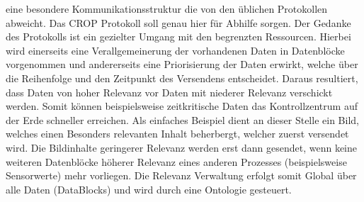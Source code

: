 eine besondere Kommunikationsstruktur die von den {\"u}blichen Protokollen 
abweicht. Das CROP Protokoll soll genau hier f{\"u}r Abhilfe sorgen. 
Der Gedanke des Protokolls ist ein gezielter Umgang mit den begrenzten 
Ressourcen. Hierbei wird einerseits eine Verallgemeinerung der vorhandenen 
Daten in Datenbl{\"o}cke vorgenommen und andererseits eine Priorisierung der 
Daten erwirkt, welche {\"u}ber die Reihenfolge und den Zeitpunkt des 
Versendens entscheidet. Daraus resultiert, dass Daten von hoher Relevanz 
vor Daten mit niederer Relevanz verschickt werden. Somit k{\"o}nnen 
beispielsweise zeitkritische Daten das Kontrollzentrum auf der Erde 
schneller erreichen. Als einfaches Beispiel dient an
dieser Stelle ein Bild, welches einen Besonders relevanten Inhalt beherbergt, welcher 
zuerst versendet wird. Die Bildinhalte geringerer Relevanz werden erst 
dann gesendet, wenn keine weiteren Datenbl{\"o}cke h{\"o}herer Relevanz 
eines anderen Prozesses (beispielsweise Sensorwerte) mehr vorliegen. Die 
Relevanz Verwaltung erfolgt somit Global {\"u}ber alle Daten (DataBlocks) 
und wird durch eine Ontologie gesteuert.

